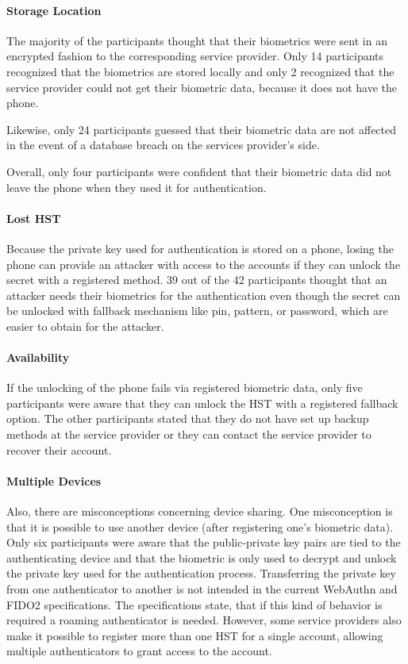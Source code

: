 \documentclass[runningheads]{llncs}
\begin{document}
\paragraph{Storage Location}
The majority of the participants thought that their biometrics were sent in an encrypted fashion to the corresponding service provider. Only 14 participants recognized that the biometrics are stored locally and only 2 recognized that the service provider could not get their biometric data, because it does not have the phone.

Likewise, only 24 participants guessed that their biometric data are not affected in the event of a database breach on the services provider's side.

Overall, only four participants were confident that their biometric data did not leave the phone when they used it for authentication.

\paragraph{Lost HST}
Because the private key used for authentication is stored on a phone, losing the phone can provide an attacker with access to the accounts if they can unlock the secret with a registered method. 39 out of the 42 participants thought that an attacker needs their biometrics for the authentication even though the secret can be unlocked with fallback mechanism like pin, pattern, or password, which are easier to obtain for the attacker.

\paragraph{Availability}
If the unlocking of the phone fails via registered biometric data, only five participants were aware that they can unlock the HST with a registered fallback option. The other participants stated that they do not have set up backup methods at the service provider or they can contact the service provider to recover their account.

\paragraph{Multiple Devices}
Also, there are misconceptions concerning device sharing. One misconception is that it is possible to use another device (after registering one's biometric data). Only six participants were aware that the public-private key pairs are tied to the authenticating device and that the biometric is only used to decrypt and unlock the private key used for the authentication process. Transferring the private key from one authenticator to another is not intended in the current WebAuthn and FIDO2 specifications. The specifications state, that if this kind of behavior is required a roaming authenticator is needed. However, some service providers also make it possible to register more than one HST for a single account, allowing multiple authenticators to grant access to the account.
\end{document}
